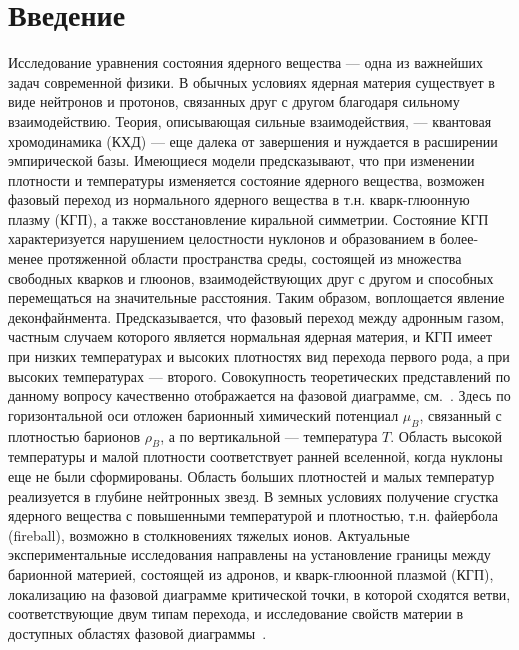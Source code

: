 \chapter*{Введение}\label{sec:secIntro}

Исследование уравнения состояния ядерного вещества --- одна из важнейших задач современной физики. В обычных условиях ядерная материя существует в виде нейтронов и протонов, связанных друг с другом благодаря сильному взаимодействию. Теория, описывающая сильные взаимодействия, --- квантовая хромодинамика (КХД) --- еще далека от завершения и нуждается в расширении эмпирической базы. Имеющиеся модели предсказывают, что при изменении плотности и температуры изменяется состояние ядерного вещества, возможен фазовый переход из нормального ядерного вещества в т.н. кварк-глюонную плазму (КГП), а также восстановление киральной симметрии. Состояние КГП характеризуется нарушением целостности нуклонов и образованием в более-менее протяженной области пространства среды, состоящей из множества свободных кварков и глюонов, взаимодействующих друг с другом и способных перемещаться на значительные расстояния. Таким образом, воплощается явление деконфайнмента. Предсказывается, что фазовый переход между адронным газом, частным случаем которого является нормальная ядерная материя, и КГП имеет при низких температурах и высоких плотностях вид перехода первого рода, а при высоких температурах --- второго.
Совокупность теоретических представлений по данному вопросу качественно отображается на фазовой диаграмме, см.~. Здесь по горизонтальной оси отложен барионный химический потенциал $\mu_{B}$, связанный с плотностью барионов $\rho_{B}$, а по вертикальной --- температура $T$. Область высокой температуры и малой плотности соответствует ранней вселенной, когда нуклоны еще не были сформированы. Область больших плотностей и малых температур реализуется в глубине нейтронных звезд. В земных условиях получение сгустка ядерного вещества с повышенными температурой и плотностью, т.н. файербола (fireball), возможно в столкновениях тяжелых ионов. Актуальные экспериментальные исследования направлены на установление границы между барионной материей, состоящей из адронов, и кварк-глюонной плазмой (КГП), локализацию на фазовой диаграмме критической точки, в которой сходятся ветви, соответствующие двум типам перехода, и исследование свойств материи в доступных областях фазовой диаграммы~\cite{CBMBook}.


